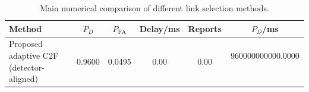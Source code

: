 \begin{table}[t]
    \centering
    \caption{Main numerical comparison of different link selection methods.}
    \label{tab:main_summary}
    \begin{tabular}{l c c c c c}
        \hline
        Method & $P_D$ & $P_{\mathrm{FA}}$ & Delay/ms & Reports & $P_D$/ms \\
        \hline
        Proposed adaptive C2F (detector-aligned) & 0.9600 & 0.0495 & 0.00 & 0.00 & 960000000000.0000 \
        \hline
    \end{tabular}
\end{table}

